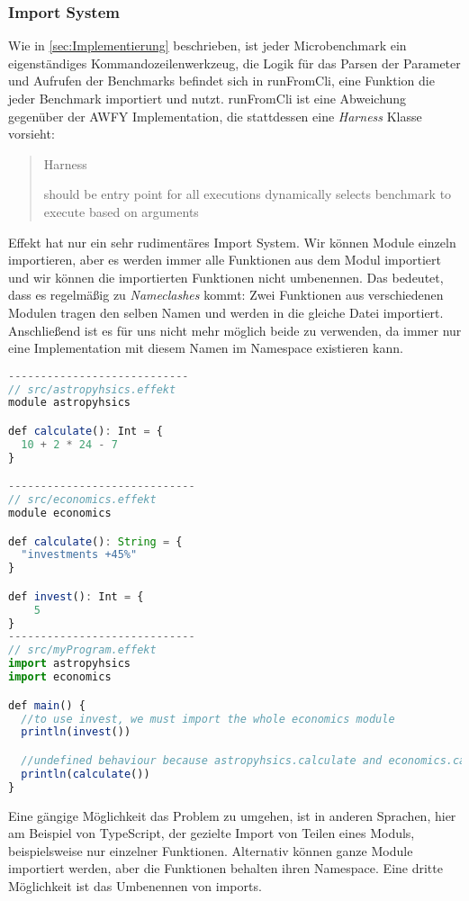\subsubsection{ Import System }
Wie in \ref{sec:Implementierung} beschrieben, ist jeder Microbenchmark ein eigenständiges Kommandozeilenwerkzeug, die Logik für das Parsen der Parameter und Aufrufen der Benchmarks befindet sich in runFromCli, eine Funktion die jeder Benchmark importiert und nutzt.
runFromCli ist eine Abweichung gegenüber der AWFY Implementation, die stattdessen eine \textit{Harness} Klasse vorsieht:
\begin{quote}
    Harness

    should be entry point for all executions
    dynamically selects benchmark to execute based on arguments
    \cite{awfyGithub}
\end{quote}
Effekt hat nur ein sehr rudimentäres Import System. Wir können Module einzeln importieren, aber es werden immer alle Funktionen aus dem Modul importiert und wir können die importierten Funktionen nicht umbenennen.
Das bedeutet, dass es regelmäßig zu \textit{Nameclashes} kommt: Zwei Funktionen aus verschiedenen Modulen tragen den selben Namen und werden in die gleiche Datei importiert. Anschließend ist es für uns nicht mehr möglich beide zu verwenden, da immer nur eine Implementation mit diesem Namen im Namespace existieren kann.
\begin{lstlisting}[language=javascript]
----------------------------
// src/astropyhsics.effekt
module astropyhsics

def calculate(): Int = {
  10 + 2 * 24 - 7
}

-----------------------------
// src/economics.effekt
module economics

def calculate(): String = {
  "investments +45%"
}

def invest(): Int = {
    5
}
-----------------------------
// src/myProgram.effekt
import astropyhsics
import economics

def main() {
  //to use invest, we must import the whole economics module
  println(invest())

  //undefined behaviour because astropyhsics.calculate and economics.calculate clash
  println(calculate())
}
\end{lstlisting}

Eine gängige Möglichkeit das Problem zu umgehen, ist in anderen Sprachen, hier am Beispiel von TypeScript, der gezielte Import von Teilen eines Moduls, beispielsweise nur einzelner Funktionen. Alternativ können ganze Module importiert werden, aber die Funktionen behalten ihren Namespace.
Eine dritte Möglichkeit ist das Umbenennen von imports.

